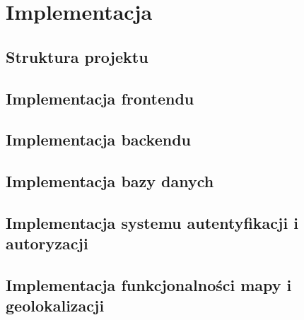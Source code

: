 %


\sloppy

\chapter{Implementacja}
\label{rozdzial4}

\section{Struktura projektu}

\section{Implementacja frontendu}

\section{Implementacja backendu}

\section{Implementacja bazy danych}

\section{Implementacja systemu autentyfikacji i autoryzacji}

\section{Implementacja funkcjonalności mapy i geolokalizacji}
